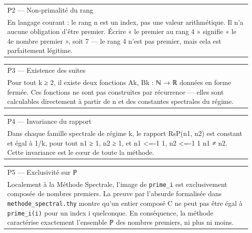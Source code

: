 \documentclass[11pt,a4paper]{article}
\begin{document}
\begin{longtable}{|p{}|}
\hline
P2 — Non-primalité du rang \\ En langage courant : le rang n est un index, pas une valeur arithmétique. Il n'a aucune obligation d'être premier. Écrire « le premier au rang 4 » signifie « le 4e nombre premier », soit 7 — le rang 4 n'est pas premier, mais cela est parfaitement légitime. \\
\hline
\end{longtable}



\begin{longtable}{|p{}|}
\hline
P3 — Existence des suites \\ Pour tout k ≥ 2, il existe deux fonctions Ak, Bk : ℕ → ℝ données en forme fermée. Ces fonctions ne sont pas construites par récurrence — elles sont calculables directement à partir de n et des constantes spectrales du régime. \\
\hline
\end{longtable}



\begin{longtable}{|p{}|}
\hline
P4 — Invariance du rapport \\ Dans chaque famille spectrale de régime k, le rapport RsP(n1, n2) est constant et égal à 1/k, pour tout n1 ≥ 1, n2 ≥ 1, et n1 <=-1 1, n2 <=-1 1 n1 ≠ n2. Cette invariance est le cœur de toute la méthode. \\
\hline
\end{longtable}



\begin{longtable}{|p{}|}
\hline
P5 — Exclusivité sur ℙ \\ Localement à la Méthode Spectrale, l'image de \texttt{prime\_i} est exclusivement composée de nombres premiers. La preuve par l'absurde formalisée dans \texttt{methode\_spectral.thy} montre qu'un entier composé C ne peut pas être égal à \texttt{prime\_i(i)} pour un index i quelconque. En conséquence, la méthode caractérise exactement l'ensemble ℙ des nombres premiers, ni plus ni moins. \\
\hline
\end{longtable}
\end{document}
